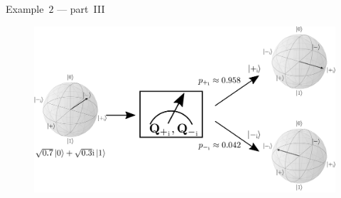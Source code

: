         \begin{frame}{Example~$2$ --- part~III}
            \begin{figure}
                \includegraphics[scale=0.2]{pics/pomiar_sy}
            \end{figure}
        \end{frame}
